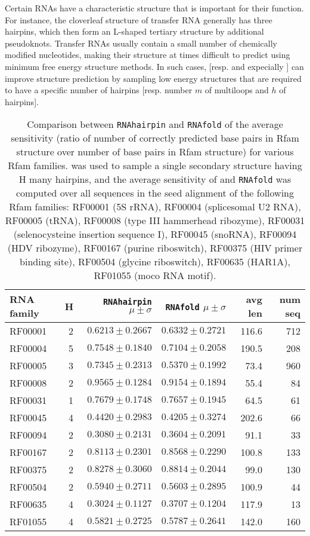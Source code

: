 Certain RNAs have a characteristic structure that is important for
their function. For instance, the cloverleaf structure of transfer RNA
generally has three hairpins,  which then form an L-shaped tertiary
structure by additional pseudoknots. Transfer RNAs usually contain
a small number of chemically modified nucleotides, making their structure
at times difficult to predict using minimum free energy structure methods.
In such cases, {\rnahairpin} [resp. and expecially {\rnahairpinml}]
can improve structure prediction by
sampling low energy structures that are required to have a specific
number of hairpins [resp. number $m$ of multiloops and $h$ of hairpins].

\begin{table*}[!t]
\begin{tabular}{|l|rrrrr|}
\hline
RNA family & H & {\tt RNAhairpin} $\mu \pm \sigma$ & {\tt RNAfold}
$\mu \pm \sigma$ & avg len & num seq\\
\hline
RF00001 & 2 & $0.6213 \pm 0.2667$ & $0.6332 \pm 0.2721$ & 116.6 & 712\\
RF00004 & 5 & $0.7548 \pm 0.1840$ & $0.7104 \pm 0.2058$ & 190.5 & 208 \\
RF00005 & 3 & $0.7345 \pm 0.2313$ & $0.5370 \pm 0.1992$ & 73.4 &960  \\
RF00008 & 2 & $0.9565 \pm 0.1284$ & $0.9154 \pm 0.1894$ & 55.4 & 84\\
RF00031 & 1 & $0.7679 \pm 0.1748$ & $0.7657 \pm 0.1945$ & 64.5 & 61\\
RF00045 & 4 & $0.4420 \pm 0.2983$ & $0.4205 \pm 0.3274$ & 202.6 & 66 \\
RF00094 & 2 & $0.3080 \pm 0.2131$ & $0.3604 \pm 0.2091$ & 91.1 & 33\\
RF00167 & 2 & $0.8113 \pm 0.2301$ & $0.8568 \pm 0.2290$ & 100.8 & 133 \\
RF00375 & 2 & $0.8278 \pm 0.3060$ & $0.8814 \pm 0.2044$ & 99.0 & 130\\
RF00504 & 2 & $0.5940 \pm 0.2711$ & $0.5603 \pm 0.2895$ & 100.9 & 44\\
RF00635 & 4 & $0.3024 \pm 0.1127$ & $0.3707 \pm 0.1204$ & 117.9 & 13\\
RF01055 & 4 & $0.5821 \pm 0.2725$ & $0.5787 \pm 0.2641$ & 142.0 & 160 \\
\hline
\end{tabular}
\caption{Comparison between {\tt RNAhairpin} and {\tt RNAfold}
of the average sensitivity (ratio of
number of correctly predicted base pairs in Rfam structure over
number of base pairs in Rfam structure) for various Rfam families.
{\rnahairpin}
was used to sample a single secondary structure having H many hairpins,
and the average sensitivity of {\rnahairpin} and {\tt RNAfold}
was computed over all sequences in the seed alignment of the following
Rfam families:
RF00001 (5S rRNA),
RF00004 (splicesomal U2 RNA),
RF00005 (tRNA),
RF00008 (type III hammerhead ribozyme),
RF00031 (selenocysteine insertion sequence I),
RF00045 (snoRNA),
RF00094 (HDV ribozyme),
RF00167 (purine riboswitch),
RF00375 (HIV primer binding site),
RF00504 (glycine riboswitch),
RF00635 (HAR1A),
RF01055 (moco RNA motif).
}
\label{table:sensitivity}
\end{table*}

